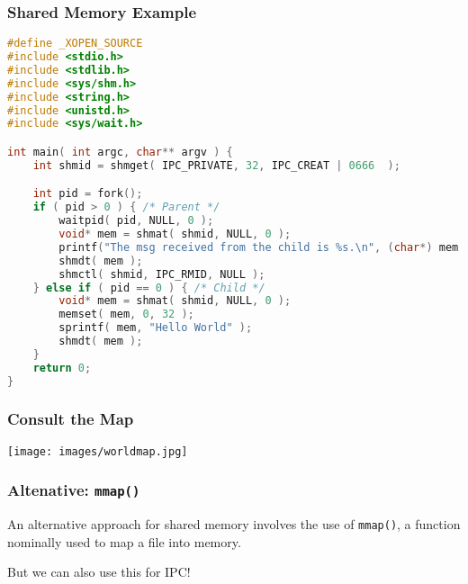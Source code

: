 \begin{frame}[fragile]
	\frametitle{Shared Memory Example}
	\begin{lstlisting}[language=C]
#define _XOPEN_SOURCE
#include <stdio.h>
#include <stdlib.h>
#include <sys/shm.h>
#include <string.h>
#include <unistd.h>
#include <sys/wait.h>

int main( int argc, char** argv ) { 
    int shmid = shmget( IPC_PRIVATE, 32, IPC_CREAT | 0666  );  

    int pid = fork();
    if ( pid > 0 ) { /* Parent */
        waitpid( pid, NULL, 0 );
        void* mem = shmat( shmid, NULL, 0 );
        printf("The msg received from the child is %s.\n", (char*) mem );
        shmdt( mem );
        shmctl( shmid, IPC_RMID, NULL );
    } else if ( pid == 0 ) { /* Child */
        void* mem = shmat( shmid, NULL, 0 );
        memset( mem, 0, 32 );
        sprintf( mem, "Hello World" );
        shmdt( mem );
    }   
    return 0;
}
\end{lstlisting}

\end{frame}

%
%
%
%
%
%

\begin{frame}
	\frametitle{Consult the Map}

	\begin{center}
		\texttt{[image: images/worldmap.jpg]}
	\end{center}


\end{frame}


\begin{frame}
	\frametitle{Altenative: \texttt{mmap()}}

	An alternative approach for shared memory involves the use of \texttt{mmap()}, a function nominally used to map a file into memory.

	But we can also use this for IPC!

\end{frame}



